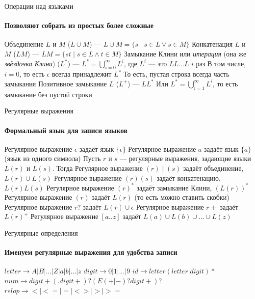 \documentclass{../../slides-style}
\begin{document}
    \begin{frame}{Операции над языками}
        \framesubtitle{Позволяют собрать из простых более сложные}
        \begin{outline}
            \1 Объединение $L$ и $M$ ($L \cup M$) --- $L \cup M = \{s \mid s \in L \vee s \in M\}$
            \1 Конкатенация $L$ и $M$ ($LM$) --- $LM = \{st \mid s \in L \wedge t \in M\}$
            \1 Замыкание Клини или \textit{итерация} (она же \textit{звёздочка Клини}) ($L^*$) --- 
                $L^* = \bigcup\limits_{i=0}^{\infty}L^i$, где $L^i$ --- это $LL \ldots L$ $i$ раз
                \2 В том числе, $i = 0$, то есть $\epsilon$ всегда принадлежит $L^*$
                    \3 То есть, пустая строка всегда часть замыкания
            \1 Позитивное замыкание $L$ ($L^+$) --- $LL^*$
                \2 Или $L^* = \bigcup\limits_{i=1}^{\infty}L^i$, то есть замыкание без пустой строки
        \end{outline}
    \end{frame}

    \begin{frame}{Регулярные выражения}
        \framesubtitle{Формальный язык для записи языков}
        \begin{outline}
            \1 Регулярное выражение $\epsilon$ задаёт язык $\{\epsilon\}$
            \1 Регулярное выражение $a$ задаёт язык $\{a\}$ (язык из одного символа)
            \1 Пусть $r$ и $s$ --- регулярные выражения, задающие языки $L(r)$ и $L(s)$. Тогда
                \2 Регулярное выражение $(r) \mid (s)$ задаёт объединение, $L(r) \cup L(s)$
                \2 Регулярное выражение $(r)(s)$ задаёт конкатенацию, $L(r)L(s)$
            \1 Регулярное выражение $(r)^*$ задаёт замыкание Клини, $(L(r))^*$
            \1 Регулярное выражение $(r)$ задаёт $L(r)$ (то есть можно ставить скобки)
            \1 Регулярное выражение $r?$ задаёт $L(r) \cup \epsilon$
            \1 Регулярное выражение $r+$ задаёт $L(r)^+$
            \1 Регулярное выражение $[a..z]$ задаёт $L(a) \cup L(b) \cup \ldots \cup L(z)$
        \end{outline}
    \end{frame}

    \begin{frame}{Регулярные определения}
        \framesubtitle{Именуем регулярные выражения для удобства записи}
        \begin{outline}
            \1 $letter \rightarrow A | B | ... | Z | a | b | ... | z$
            \1 $digit \rightarrow 0 | 1 | ... | 9$
            \1 $id \rightarrow letter (letter | digit)*$
            \1 $num \rightarrow digit+ (. digit+)? (E(+ | -)? digit+)?$
            \1 $relop \rightarrow < | <= | = | <> | > | >=$
        \end{outline}
    \end{frame}
\end{document}
